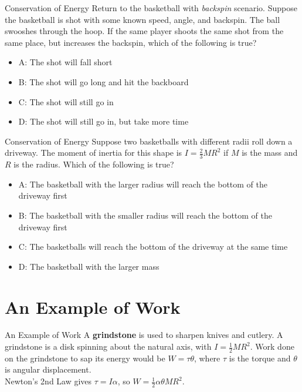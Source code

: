 \documentclass{beamer}
\begin{document}
\begin{frame}{Conservation of Energy}
Return to the basketball with \textit{backspin} scenario.  Suppose the basketball is shot with some known speed, angle, and backspin.  The ball swooshes through the hoop.  If the same player shoots the same shot from the same place, but increases the backspin, which of the following is true?
\begin{itemize}
\item A: The shot will fall short
\item B: The shot will go long and hit the backboard
\item C: The shot will still go in
\item D: The shot will still go in, but take more time
\end{itemize}
\end{frame}

\begin{frame}{Conservation of Energy}
Suppose two basketballs with different radii roll down a driveway.  The moment of inertia for this shape is $I = \frac{2}{3}MR^2$ if $M$ is the mass and $R$ is the radius.  Which of the following is true?
\begin{itemize}
\item A: The basketball with the larger radius will reach the bottom of the driveway first
\item B: The basketball with the smaller radius will reach the bottom of the driveway first
\item C: The basketballs will reach the bottom of the driveway at the same time
\item D: The basketball with the larger mass
\end{itemize}
\end{frame}

\section{An Example of Work}

\begin{frame}{An Example of Work}
\small
A \textbf{grindstone} is used to sharpen knives and cutlery.  A grindstone is a disk spinning about the natural axis, with $I = \frac{1}{2}MR^2$.  Work done on the grindstone to sap its energy would be $W = \tau\theta$, where $\tau$ is the torque and $\theta$ is angular displacement.  \\ \vspace{0.5cm}
Newton's 2nd Law gives $\tau = I\alpha$, so $W = \frac{1}{2}\alpha\theta MR^2$. \\ \vspace{0.5cm}
\end{frame}
\end{document}
